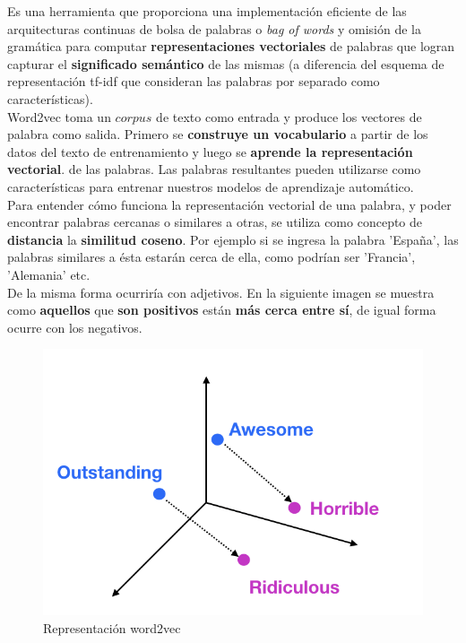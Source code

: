 \documentclass[a4paper,12pt]{report}
\begin{document}
Es una herramienta que proporciona una implementación eficiente de las arquitecturas continuas de bolsa de palabras o \textit{bag of words} y omisión de la gramática para computar \textbf{representaciones vectoriales} de palabras que logran capturar el \textbf{significado semántico} de las mismas (a diferencia del esquema de representación tf-idf que consideran las palabras por separado como características).
\vspace{2mm}\\
Word2vec toma un $corpus$ de texto como entrada y produce los vectores de palabra como salida. 
Primero se \textbf{construye un vocabulario} a partir de los datos del texto de entrenamiento y luego se \textbf{aprende la representación vectorial}. de las palabras. Las palabras resultantes pueden utilizarse como características para entrenar nuestros modelos de aprendizaje automático. 
\vspace{2mm}\\
Para entender cómo funciona la representación vectorial de una palabra, y poder encontrar palabras cercanas o similares a otras, se utiliza como concepto de \textbf{distancia} la \textbf{similitud coseno}. Por ejemplo si se ingresa la palabra 'España', las palabras similares a ésta estarán cerca de ella, como podrían ser 'Francia', 'Alemania' etc.
\vspace{2mm}\\
De la misma forma ocurriría con adjetivos. En la siguiente imagen se muestra como \textbf{aquellos} que \textbf{son positivos} están \textbf{más cerca entre sí}, de igual forma ocurre con los negativos. 


\vspace{4mm}
\begin{figure}[htbp!]
\centering
\includegraphics[scale=0.4]{images/w.png}
\caption{Representación word2vec}
\end{figure}
\vspace{2mm}
\end{document}
